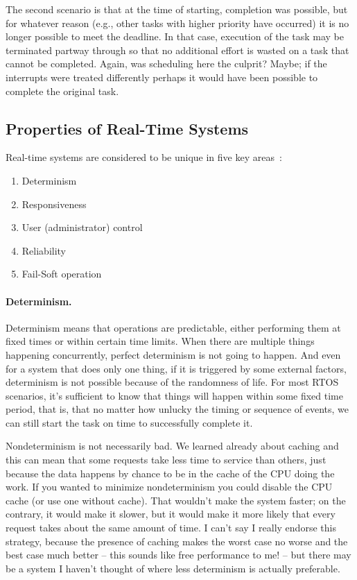 The second scenario is that at the time of starting, completion was possible, but for whatever reason (e.g., other tasks with higher priority have occurred) it is no longer possible to meet the deadline. In that case, execution of the task may be terminated partway through so that no additional effort is wasted on a task that cannot be completed. Again, was scheduling here the culprit? Maybe; if the interrupts were treated differently perhaps it would have been possible to complete the original task.

\subsection*{Properties of Real-Time Systems}
Real-time systems are considered to be unique in five key areas~\cite{osi}:

\begin{enumerate}
	\item Determinism
	\item Responsiveness
	\item User (administrator) control
	\item Reliability
	\item Fail-Soft operation
\end{enumerate}

\paragraph{Determinism.} Determinism means that operations are predictable, either performing them at fixed times or within certain time limits. When there are multiple things happening concurrently, perfect determinism is not going to happen. And even for a system that does only one thing, if it is triggered by some external factors, determinism is not possible because of the randomness of life. For most RTOS scenarios, it's sufficient to know that things will happen within some fixed time period, that is, that no matter how unlucky the timing or sequence of events, we can still start the task on time to successfully complete it.

Nondeterminism is not necessarily bad. We learned already about caching and this can mean that some requests take less time to service than others, just because the data happens by chance to be in the cache of the CPU doing the work. If you wanted to minimize nondeterminism you could disable the CPU cache (or use one without cache). That wouldn't make the system faster; on the contrary, it would make it slower, but it would make it more likely that every request takes about the same amount of time. I can't say I really endorse this strategy, because the presence of caching makes the worst case no worse and the best case much better -- this sounds like free performance to me! -- but there may be a system I haven't thought of where less determinism is actually preferable.

